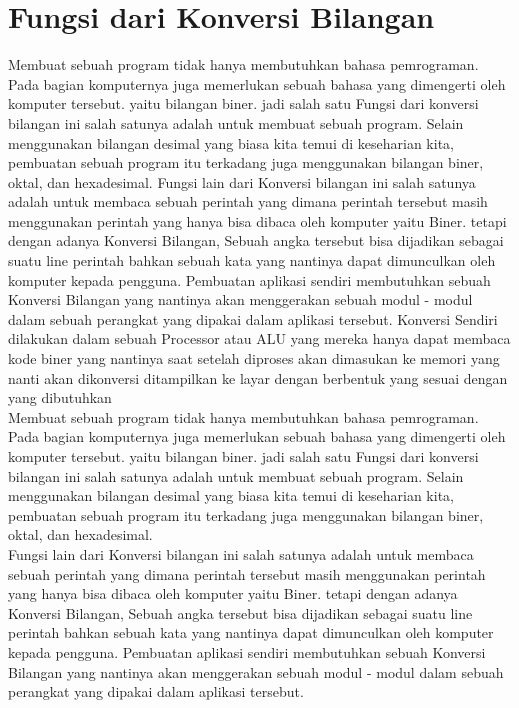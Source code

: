 {\section{Fungsi dari Konversi Bilangan} %
Membuat sebuah program tidak hanya membutuhkan bahasa pemrograman. Pada bagian komputernya juga memerlukan sebuah bahasa yang dimengerti oleh komputer tersebut. yaitu bilangan biner. jadi salah satu Fungsi dari konversi bilangan ini salah satunya adalah untuk membuat sebuah program. Selain menggunakan bilangan desimal yang biasa kita temui di keseharian kita, pembuatan sebuah program itu terkadang juga menggunakan bilangan biner, oktal, dan hexadesimal.
Fungsi lain dari Konversi bilangan ini salah satunya adalah untuk membaca sebuah perintah yang dimana perintah tersebut masih menggunakan perintah yang hanya bisa dibaca oleh komputer yaitu Biner. tetapi dengan adanya Konversi Bilangan, Sebuah angka tersebut bisa dijadikan sebagai suatu line perintah bahkan sebuah kata yang nantinya dapat dimunculkan oleh komputer kepada pengguna. Pembuatan aplikasi sendiri membutuhkan sebuah Konversi Bilangan yang nantinya akan menggerakan sebuah modul - modul dalam sebuah perangkat yang dipakai dalam aplikasi tersebut. 
Konversi Sendiri dilakukan dalam sebuah Processor atau ALU yang mereka hanya dapat membaca kode biner yang nantinya saat setelah diproses akan dimasukan ke memori yang nanti akan dikonversi ditampilkan ke layar dengan berbentuk yang sesuai dengan yang dibutuhkan
\\Membuat sebuah program tidak hanya membutuhkan bahasa pemrograman. Pada bagian komputernya juga memerlukan sebuah bahasa yang dimengerti oleh komputer tersebut. yaitu bilangan biner. jadi salah satu Fungsi dari konversi bilangan ini salah satunya adalah untuk membuat sebuah program. Selain menggunakan bilangan desimal yang biasa kita temui di keseharian kita, pembuatan sebuah program itu terkadang juga menggunakan bilangan biner, oktal, dan hexadesimal.
\\Fungsi lain dari Konversi bilangan ini salah satunya adalah untuk membaca sebuah perintah yang dimana perintah tersebut masih menggunakan perintah yang hanya bisa dibaca oleh komputer yaitu Biner. tetapi dengan adanya Konversi Bilangan, Sebuah angka tersebut bisa dijadikan sebagai suatu line perintah bahkan sebuah kata yang nantinya dapat dimunculkan oleh komputer kepada pengguna. Pembuatan aplikasi sendiri membutuhkan sebuah Konversi Bilangan yang nantinya akan menggerakan sebuah modul - modul dalam sebuah perangkat yang dipakai dalam aplikasi tersebut. 

}
